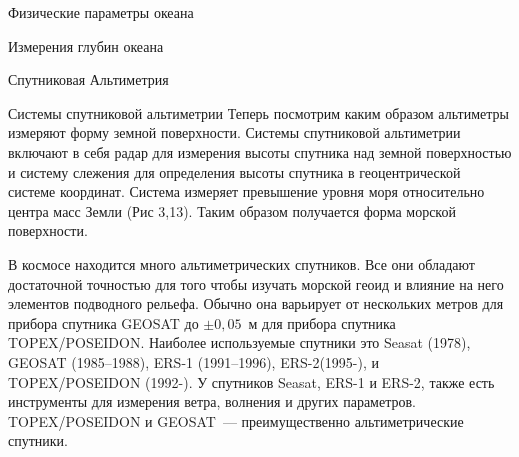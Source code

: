 \begin{chapter}{Физические параметры океана}
\begin{section}{Измерения глубин океана}
\begin{subsection}{Спутниковая Альтиметрия}
\begin{subsubsection}{Системы спутниковой альтиметрии}
Теперь посмотрим каким образом альтиметры измеряют форму земной
поверхности. Системы спутниковой альтиметрии включают в себя радар для
измерения высоты спутника над земной поверхностью и систему слежения
для определения высоты спутника в геоцентрической системе
координат. Система измеряет превышение уровня моря относительно центра
масс Земли (Рис 3,13). Таким образом получается форма морской
поверхности.
%

В космосе находится много альтиметрических спутников. Все они обладают
достаточной точностью для того чтобы изучать морской геоид и влияние
на него элементов подводного рельефа. Обычно она варьирует от
нескольких метров для прибора спутника GEOSAT до $\pm 0,05$~м для прибора
спутника TOPEX/POSEIDON. Наиболее используемые спутники это Seasat
(1978), GEOSAT (1985–1988), ERS-1 (1991--1996), ERS-2(1995-), и
TOPEX/POSEIDON (1992-). У спутников Seasat, ERS-1 и ERS-2, также есть
инструменты для измерения ветра, волнения и других
параметров. TOPEX/POSEIDON и GEOSAT~--- преимущественно
альтиметрические спутники.
%

\end{subsubsection}




\end{subsection}
\end{section}
\end{chapter}
